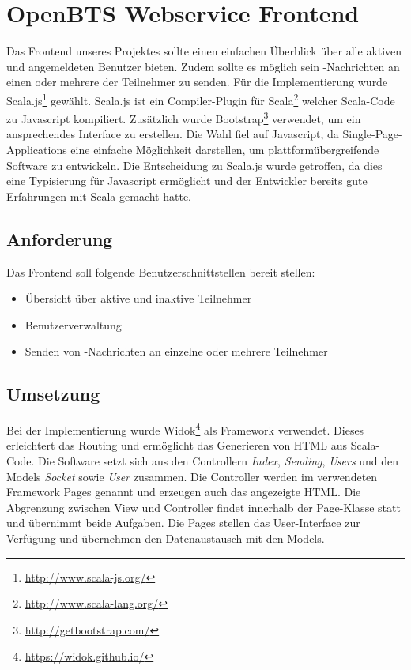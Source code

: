 \section{OpenBTS Webservice Frontend}
\label{sec:frontend}
Das Frontend unseres Projektes sollte einen einfachen Überblick über alle aktiven und angemeldeten Benutzer bieten. Zudem sollte es möglich sein \SMS-Nachrichten an einen oder mehrere der Teilnehmer zu senden. Für die Implementierung wurde Scala.js\footnote{\url{http://www.scala-js.org/}} gewählt. Scala.js ist ein Compiler-Plugin für Scala\footnote{\url{http://www.scala-lang.org/}} welcher Scala-Code zu Javascript kompiliert. Zusätzlich wurde Bootstrap\footnote{\url{http://getbootstrap.com/}} verwendet, um ein ansprechendes Interface zu erstellen.
Die Wahl fiel auf Javascript, da Single-Page-Applications eine einfache Möglichkeit darstellen, um plattformübergreifende Software zu entwickeln. Die Entscheidung zu Scala.js wurde getroffen, da dies eine Typisierung für Javascript ermöglicht und der Entwickler bereits gute Erfahrungen mit Scala gemacht hatte.

\subsection{Anforderung}
Das Frontend soll folgende Benutzerschnittstellen bereit stellen:
\begin{itemize}
	\item Übersicht über aktive und inaktive Teilnehmer
	\item Benutzerverwaltung
	\item Senden von \SMS-Nachrichten an einzelne oder mehrere Teilnehmer
\end{itemize}

\subsection{Umsetzung}
Bei der Implementierung wurde Widok\footnote{\url{https://widok.github.io/}} als Framework verwendet. Dieses erleichtert das Routing und ermöglicht das Generieren von HTML aus Scala-Code.
Die Software setzt sich aus den Controllern \emph{Index}, \emph{Sending}, \emph{Users} und den Models \emph{Socket} sowie \emph{User} zusammen. Die Controller werden im verwendeten Framework Pages genannt und erzeugen auch das angezeigte HTML. Die Abgrenzung zwischen View und Controller findet innerhalb der Page-Klasse statt und übernimmt beide Aufgaben. Die Pages stellen das User-Interface zur Verfügung und übernehmen den Datenaustausch mit den Models.

